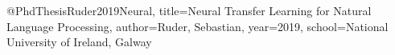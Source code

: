 @PhdThesis{Ruder2019Neural,
  title={Neural Transfer Learning for Natural Language Processing},
  author={Ruder, Sebastian},
  year={2019},
  school={National University of Ireland, Galway}
}
